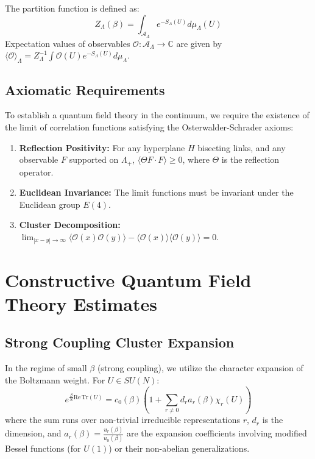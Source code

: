 The partition function is defined as:
\begin{equation}
Z_\Lambda(\beta) = \int_{\mathcal{A}_\Lambda} e^{-S_\Lambda(U)} d\mu_\Lambda(U)
\end{equation}
Expectation values of observables $\mathcal{O}: \mathcal{A}_\Lambda \to \mathbb{C}$ are given by $\langle \mathcal{O} \rangle_\Lambda = Z_\Lambda^{-1} \int \mathcal{O}(U) e^{-S_\Lambda(U)} d\mu_\Lambda$.

\subsection{Axiomatic Requirements}
To establish a quantum field theory in the continuum, we require the existence of the limit of correlation functions satisfying the Osterwalder-Schrader axioms:
\begin{enumerate}
    \item \textbf{Reflection Positivity:} For any hyperplane $H$ bisecting links, and any observable $F$ supported on $\Lambda_+$, $\langle \Theta F \cdot F \rangle \ge 0$, where $\Theta$ is the reflection operator.
    \item \textbf{Euclidean Invariance:} The limit functions must be invariant under the Euclidean group $E(4)$.
    \item \textbf{Cluster Decomposition:} $\lim_{|x-y|\to\infty} \langle \mathcal{O}(x) \mathcal{O}(y) \rangle - \langle \mathcal{O}(x) \rangle \langle \mathcal{O}(y) \rangle = 0$.
\end{enumerate}


\section{Constructive Quantum Field Theory Estimates}
\label{sec:technical_details_app145}

\subsection{Strong Coupling Cluster Expansion}
In the regime of small $\beta$ (strong coupling), we utilize the character expansion of the Boltzmann weight. For $U \in SU(N)$:
\begin{equation}
e^{\frac{\beta}{N} \mathrm{Re}\,\mathrm{Tr}(U)} = c_0(\beta) \left( 1 + \sum_{r \neq 0} d_r a_r(\beta) \chi_r(U) \right)
\end{equation}
where the sum runs over non-trivial irreducible representations $r$, $d_r$ is the dimension, and $a_r(\beta) = \frac{u_r(\beta)}{u_0(\beta)}$ are the expansion coefficients involving modified Bessel functions (for $U(1)$) or their non-abelian generalizations.

